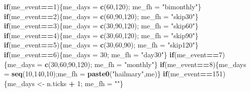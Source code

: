 \documentclass[10,portrait]{article}
\newenvironment{Shaded}{\begin{snugshade}}{\end{snugshade}}
\newcommand{\KeywordTok}[1]{\textcolor[rgb]{0.13,0.29,0.53}{\textbf{#1}}}
\newcommand{\DecValTok}[1]{\textcolor[rgb]{0.00,0.00,0.81}{#1}}
\newcommand{\StringTok}[1]{\textcolor[rgb]{0.31,0.60,0.02}{#1}}
\newcommand{\ControlFlowTok}[1]{\textcolor[rgb]{0.13,0.29,0.53}{\textbf{#1}}}
\newcommand{\OperatorTok}[1]{\textcolor[rgb]{0.81,0.36,0.00}{\textbf{#1}}}
\newcommand{\NormalTok}[1]{#1}
\begin{document}
\begin{Shaded}
\begin{Highlighting}[]
{{{          \ControlFlowTok{if}\NormalTok{(me_event}\OperatorTok{==}\DecValTok{1}\NormalTok{)\{me_days =}\StringTok{ }\KeywordTok{c}\NormalTok{(}\DecValTok{60}\NormalTok{,}\DecValTok{120}\NormalTok{); me_fh =}\StringTok{ "bimonthly"}\NormalTok{\}}
          \ControlFlowTok{if}\NormalTok{(me_event}\OperatorTok{==}\DecValTok{2}\NormalTok{)\{me_days =}\StringTok{ }\KeywordTok{c}\NormalTok{(}\DecValTok{60}\NormalTok{,}\DecValTok{90}\NormalTok{,}\DecValTok{120}\NormalTok{); me_fh =}\StringTok{ "skip30"}\NormalTok{\}}
          \ControlFlowTok{if}\NormalTok{(me_event}\OperatorTok{==}\DecValTok{3}\NormalTok{)\{me_days =}\StringTok{ }\KeywordTok{c}\NormalTok{(}\DecValTok{30}\NormalTok{,}\DecValTok{90}\NormalTok{,}\DecValTok{120}\NormalTok{); me_fh =}\StringTok{ "skip60"}\NormalTok{\}}
          \ControlFlowTok{if}\NormalTok{(me_event}\OperatorTok{==}\DecValTok{4}\NormalTok{)\{me_days =}\StringTok{ }\KeywordTok{c}\NormalTok{(}\DecValTok{30}\NormalTok{,}\DecValTok{60}\NormalTok{,}\DecValTok{120}\NormalTok{); me_fh =}\StringTok{ "skip90"}\NormalTok{\}}
          \ControlFlowTok{if}\NormalTok{(me_event}\OperatorTok{==}\DecValTok{5}\NormalTok{)\{me_days =}\StringTok{ }\KeywordTok{c}\NormalTok{(}\DecValTok{30}\NormalTok{,}\DecValTok{60}\NormalTok{,}\DecValTok{90}\NormalTok{); me_fh =}\StringTok{ "skip120"}\NormalTok{\}}
          \ControlFlowTok{if}\NormalTok{(me_event}\OperatorTok{==}\DecValTok{6}\NormalTok{)\{me_days =}\StringTok{ }\DecValTok{30}\NormalTok{; me_fh =}\StringTok{ "day30"}\NormalTok{\}}
          \ControlFlowTok{if}\NormalTok{(me_event}\OperatorTok{==}\DecValTok{7}\NormalTok{)\{me_days =}\StringTok{ }\KeywordTok{c}\NormalTok{(}\DecValTok{30}\NormalTok{,}\DecValTok{60}\NormalTok{,}\DecValTok{90}\NormalTok{,}\DecValTok{120}\NormalTok{); me_fh =}\StringTok{ "monthly"}\NormalTok{\}}
          \ControlFlowTok{if}\NormalTok{(me_event}\OperatorTok{==}\DecValTok{8}\NormalTok{)\{me_days =}\StringTok{ }\KeywordTok{seq}\NormalTok{(}\DecValTok{10}\NormalTok{,}\DecValTok{140}\NormalTok{,}\DecValTok{10}\NormalTok{);me_fh =}\StringTok{ }\KeywordTok{paste0}\NormalTok{(}\StringTok{"hailmary"}\NormalTok{,me)\}}
          \ControlFlowTok{if}\NormalTok{(me_event}\OperatorTok{==}\DecValTok{151}\NormalTok{)\{me_days <-}\StringTok{ }\NormalTok{n.ticks }\OperatorTok{+}\StringTok{ }\DecValTok{1}\NormalTok{; me_fh =}\StringTok{ ""}\NormalTok{\}}
          
}}}
\end{Highlighting}
\end{Shaded}
\end{document}
